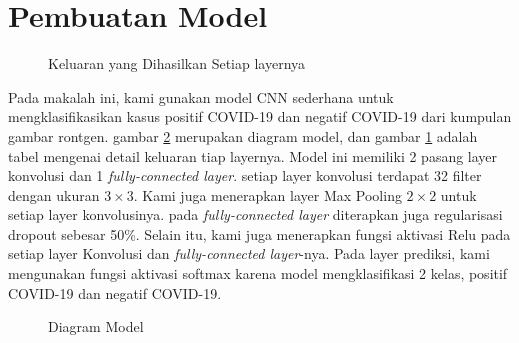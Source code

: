 \section{Pembuatan Model}

\begin{figure}[h!]
  \centering  {}
  \caption{Keluaran yang Dihasilkan Setiap layernya}
  \label{detail cnn}
\end{figure}



Pada makalah ini, kami gunakan model CNN sederhana untuk mengklasifikasikan kasus  positif COVID-19 dan negatif COVID-19 dari kumpulan gambar rontgen. gambar \ref{alur CNN} merupakan diagram model, dan gambar \ref{detail cnn} adalah tabel mengenai detail keluaran tiap layernya.  Model ini memiliki 2 pasang layer konvolusi dan 1 \textit{fully-connected layer}. setiap layer konvolusi terdapat 32 filter dengan  ukuran $3\times 3$. Kami juga menerapkan layer Max Pooling $2\times 2$ untuk setiap layer konvolusinya. pada \textit{fully-connected layer} diterapkan juga regularisasi dropout sebesar 50\%. Selain itu, kami juga menerapkan fungsi aktivasi Relu pada setiap layer Konvolusi dan \textit{fully-connected layer}-nya. Pada layer prediksi, kami mengunakan fungsi aktivasi softmax karena model mengklasifikasi 2 kelas, positif COVID-19 dan negatif COVID-19.

\begin{figure}[h!]
  \centering
  \caption{Diagram Model}
  \label{alur CNN}
\end{figure}

